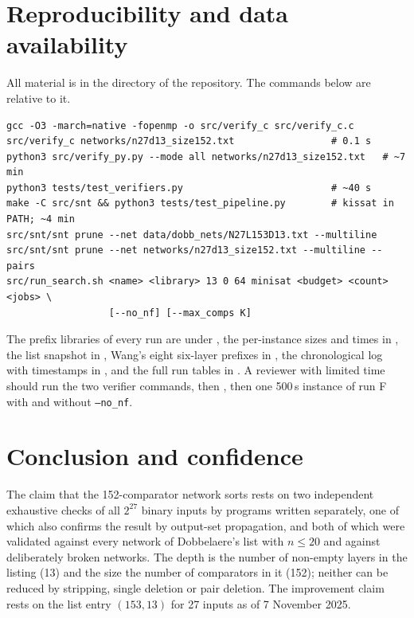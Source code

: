 \documentclass[11pt,a4paper]{article}
\theoremstyle{plain}
\theoremstyle{definition}
\theoremstyle{remark}
\newcommand{\dob}{Dobbelaere's list}
\begin{document}
\section{Reproducibility and data availability}\label{sec:repro-cmds}

All material is in the directory  of the repository. The commands below are relative to it.

{\small
\begin{verbatim}
gcc -O3 -march=native -fopenmp -o src/verify_c src/verify_c.c
src/verify_c networks/n27d13_size152.txt                 # 0.1 s
python3 src/verify_py.py --mode all networks/n27d13_size152.txt   # ~7 min
python3 tests/test_verifiers.py                          # ~40 s
make -C src/snt && python3 tests/test_pipeline.py        # kissat in PATH; ~4 min
src/snt/snt prune --net data/dobb_nets/N27L153D13.txt --multiline
src/snt/snt prune --net networks/n27d13_size152.txt --multiline --pairs
src/run_search.sh <name> <library> 13 0 64 minisat <budget> <count> <jobs> \
                  [--no_nf] [--max_comps K]
\end{verbatim}
}

\noindent The prefix libraries of every run are under , the per-instance sizes and times in , the list snapshot in , Wang's eight six-layer prefixes in , the chronological log with timestamps in , and the full run tables in . A reviewer with limited time should run the two verifier commands, then , then one 500\,s instance of run F with and without \texttt{--no\_nf}.

\section{Conclusion and confidence}\label{sec:conclusion}

The claim that the 152-comparator network sorts rests on two independent exhaustive checks of all $2^{27}$ binary inputs by programs written separately, one of which also confirms the result by output-set propagation, and both of which were validated against every network of \dob{} with $n\le 20$ and against deliberately broken networks. The depth is the number of non-empty layers in the listing (13) and the size the number of comparators in it (152); neither can be reduced by stripping, single deletion or pair deletion. The improvement claim rests on the list entry $(153,13)$ for 27 inputs as of 7 November 2025.
\end{document}
